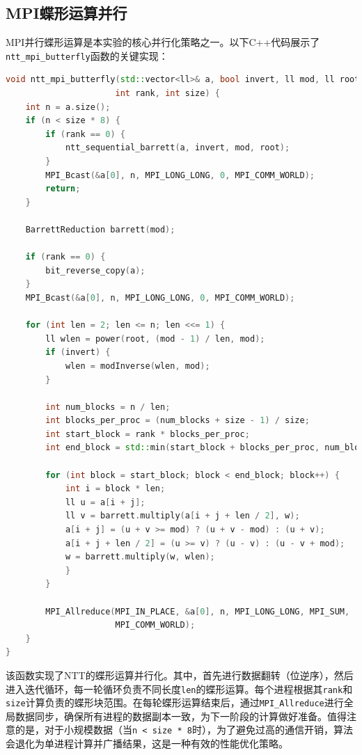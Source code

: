 \documentclass[a4paper]{article}
\begin{document}
\subsection{MPI蝶形运算并行}

MPI并行蝶形运算是本实验的核心并行化策略之一。以下C++代码展示了\texttt{ntt\_mpi\_butterfly}函数的关键实现：

\begin{lstlisting}[title=MPI并行蝶形运算,frame=trbl,language={C++}]
void ntt_mpi_butterfly(std::vector<ll>& a, bool invert, ll mod, ll root, 
                      int rank, int size) {
    int n = a.size();
    if (n < size * 8) {
        if (rank == 0) {
            ntt_sequential_barrett(a, invert, mod, root);
        }
        MPI_Bcast(&a[0], n, MPI_LONG_LONG, 0, MPI_COMM_WORLD);
        return;
    }

    BarrettReduction barrett(mod);
    
    if (rank == 0) {
        bit_reverse_copy(a);
    }
    MPI_Bcast(&a[0], n, MPI_LONG_LONG, 0, MPI_COMM_WORLD);

    for (int len = 2; len <= n; len <<= 1) {
        ll wlen = power(root, (mod - 1) / len, mod);
        if (invert) {
            wlen = modInverse(wlen, mod);
        }

        int num_blocks = n / len;
        int blocks_per_proc = (num_blocks + size - 1) / size;
        int start_block = rank * blocks_per_proc;
        int end_block = std::min(start_block + blocks_per_proc, num_blocks);

        for (int block = start_block; block < end_block; block++) {
            int i = block * len;
            ll u = a[i + j];
            ll v = barrett.multiply(a[i + j + len / 2], w);
            a[i + j] = (u + v >= mod) ? (u + v - mod) : (u + v);
            a[i + j + len / 2] = (u >= v) ? (u - v) : (u - v + mod);
            w = barrett.multiply(w, wlen);
            }
        }

        MPI_Allreduce(MPI_IN_PLACE, &a[0], n, MPI_LONG_LONG, MPI_SUM, 
                      MPI_COMM_WORLD);
    }
}
\end{lstlisting}
该函数实现了NTT的蝶形运算并行化。其中，首先进行数据翻转（位逆序），然后进入迭代循环，每一轮循环负责不同长度\texttt{len}的蝶形运算。每个进程根据其\texttt{rank}和\texttt{size}计算负责的蝶形块范围。在每轮蝶形运算结束后，通过\texttt{MPI\_Allreduce}进行全局数据同步，确保所有进程的数据副本一致，为下一阶段的计算做好准备。值得注意的是，对于小规模数据（当\texttt{n < size * 8}时），为了避免过高的通信开销，算法会退化为单进程计算并广播结果，这是一种有效的性能优化策略。
\end{document}
